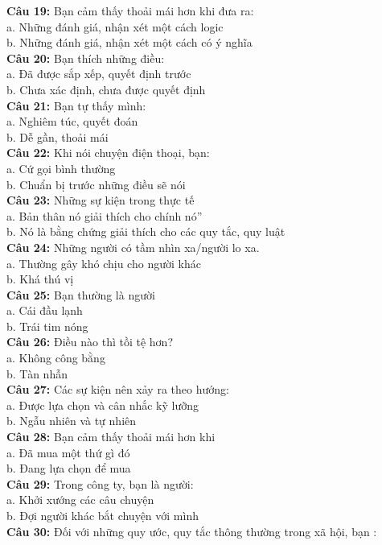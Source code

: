 \begin{multicols}{2}
\textbf{Câu 19:} Bạn cảm thấy thoải mái hơn khi đưa ra: \\
a. Những đánh giá, nhận xét một cách logic \\
b. Những đánh giá, nhận xét một cách có ý nghĩa \\
\textbf{Câu 20:} Bạn thích những điều: \\
a. Đã được sắp xếp, quyết định trước \\
b. Chưa xác định, chưa được quyết định \\
\textbf{Câu 21:} Bạn tự thấy mình: \\
a. Nghiêm túc, quyết đoán \\
b. Dễ gần, thoải mái \\
\textbf{Câu 22:} Khi nói chuyện điện thoại, bạn: \\
a. Cứ gọi bình thường \\
b. Chuẩn bị trước những điều sẽ nói \\
\textbf{Câu 23:} Những sự kiện trong thực tế \\
a. Bản thân nó giải thích cho chính nó” \\
b. Nó là bằng chứng giải thích cho các quy tắc, quy luật \\
\textbf{Câu 24:} Những người có tầm nhìn xa/người lo xa. \\
a. Thường gây khó chịu cho người khác \\
b. Khá thú vị \\
\textbf{Câu 25:} Bạn thường là người \\
a. Cái đầu lạnh \\
b. Trái tim nóng \\
\textbf{Câu 26:} Điều nào thì tồi tệ hơn? \\
a. Không công bằng \\
b. Tàn nhẫn \\
\textbf{Câu 27:} Các sự kiện nên xảy ra theo hướng: \\
a. Được lựa chọn và cân nhắc kỹ lưỡng \\
b. Ngẫu nhiên và tự nhiên \\
\textbf{Câu 28:} Bạn cảm thấy thoải mái hơn khi \\
a. Đã mua một thứ gì đó \\
b. Đang lựa chọn để mua \\
\textbf{Câu 29:} Trong công ty, bạn là người: \\
a. Khởi xướng các câu chuyện \\
b. Đợi người khác bắt chuyện với mình \\
\textbf{Câu 30:} Đối với những quy ước, quy tắc thông thường trong xã hội, bạn : \\

\end{multicols}
